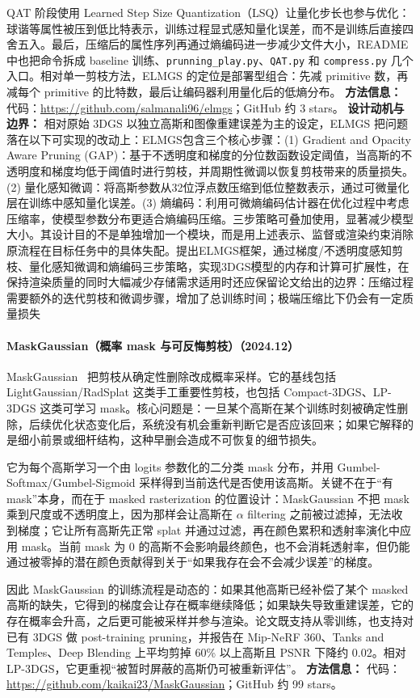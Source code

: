 QAT 阶段使用 Learned Step Size Quantization（LSQ）让量化步长也参与优化：球谐等属性被压到低比特表示，训练过程显式感知量化误差，而不是训练后直接四舍五入。最后，压缩后的属性序列再通过熵编码进一步减少文件大小，README 中也把命令拆成 baseline 训练、\texttt{prunning\_play.py}、\texttt{QAT.py} 和 \texttt{compress.py} 几个入口。相对单一剪枝方法，ELMGS 的定位是部署型组合：先减 primitive 数，再减每个 primitive 的比特数，最后让编码器利用量化后的低熵分布。
\textbf{方法信息：} 代码：\url{https://github.com/salmanali96/elmgs}；GitHub 约 3 stars。
\textbf{设计动机与边界：} 相对原始 3DGS 以独立高斯和图像重建误差为主的设定，ELMGS 把问题落在以下可实现的改动上：ELMGS包含三个核心步骤：(1) Gradient and Opacity Aware Pruning (GAP)：基于不透明度和梯度的分位数函数设定阈值，当高斯的不透明度和梯度均低于阈值时进行剪枝，并周期性微调以恢复剪枝带来的质量损失。(2) 量化感知微调：将高斯参数从32位浮点数压缩到低位整数表示，通过可微量化层在训练中感知量化误差。(3) 熵编码：利用可微熵编码估计器在优化过程中考虑压缩率，使模型参数分布更适合熵编码压缩。三步策略可叠加使用，显著减少模型大小。其设计目的不是单独增加一个模块，而是用上述表示、监督或渲染约束消除原流程在目标任务中的具体失配。提出ELMGS框架，通过梯度/不透明度感知剪枝、量化感知微调和熵编码三步策略，实现3DGS模型的内存和计算可扩展性，在保持渲染质量的同时大幅减少存储需求适用时还应保留论文给出的边界：压缩过程需要额外的迭代剪枝和微调步骤，增加了总训练时间；极端压缩比下仍会有一定质量损失
\paragraph{MaskGaussian（概率 mask 与可反悔剪枝）（2024.12）}
MaskGaussian~\cite{2412_20522} 把剪枝从确定性删除改成概率采样。它的基线包括 LightGaussian/RadSplat 这类手工重要性剪枝，也包括 Compact-3DGS、LP-3DGS 这类可学习 mask。核心问题是：一旦某个高斯在某个训练时刻被确定性删除，后续优化状态变化后，系统没有机会重新判断它是否应该回来；如果它解释的是细小前景或细杆结构，这种早删会造成不可恢复的细节损失。

它为每个高斯学习一个由 logits 参数化的二分类 mask 分布，并用 Gumbel-Softmax/Gumbel-Sigmoid 采样得到当前迭代是否使用该高斯。关键不在于“有 mask”本身，而在于 masked rasterization 的位置设计：MaskGaussian 不把 mask 乘到尺度或不透明度上，因为那样会让高斯在 $\alpha$ filtering 之前被过滤掉，无法收到梯度；它让所有高斯先正常 splat 并通过过滤，再在颜色累积和透射率演化中应用 mask。当前 mask 为 0 的高斯不会影响最终颜色，也不会消耗透射率，但仍能通过被零掉的潜在颜色贡献得到关于“如果我存在会不会减少误差”的梯度。

因此 MaskGaussian 的训练流程是动态的：如果其他高斯已经补偿了某个 masked 高斯的缺失，它得到的梯度会让存在概率继续降低；如果缺失导致重建误差，它的存在概率会升高，之后更可能被采样并参与渲染。论文既支持从零训练，也支持对已有 3DGS 做 post-training pruning，并报告在 Mip-NeRF 360、Tanks and Temples、Deep Blending 上平均剪掉 60\% 以上高斯且 PSNR 下降约 0.02。相对 LP-3DGS，它更重视“被暂时屏蔽的高斯仍可被重新评估”。
\textbf{方法信息：} 代码：\url{https://github.com/kaikai23/MaskGaussian}；GitHub 约 99 stars。



